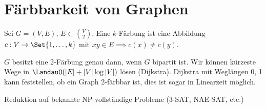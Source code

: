 

\section{Färbbarkeit von Graphen}

\begin{df}
    Sei $G = (V, E)$, $E \subset \binom{V}{2}$.
    Eine $k$-Färbung ist eine Abbildung $c: V \to \Set{1, \dotsc, k}$ mit
    \begin{math}
        xy \in E \implies c(x) \neq c(y).
    \end{math}
\end{df}

$G$ besitzt eine 2-Färbung genau dann, wenn $G$ bipartit ist.
Wir können kürzeste Wege in $\LandauO(|E| + |V|\log |V|)$ lösen (Dijkstra).
Dijkstra mit Weglängen 0, 1 kann feststellen, ob ein Graph 2-färbbar ist, dies ist sogar in Linearzeit möglich.

Reduktion auf bekannte NP-vollständige Probleme (3-SAT, NAE-SAT, etc.)

